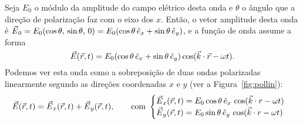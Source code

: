Seja $E_0$ o módulo
da amplitude do campo elétrico desta onda e $\theta$ o ângulo que a direção de
polarização faz com o
eixo dos $x$. Então, o vetor amplitude desta onda é $\vec
E_0=E_0(\cos\theta,\,\sin\theta,\,0)= E_0(\cos\theta\,\he_x+\sin\theta\,\he_y)$,
e a função de onda assume a forma
\begin{equation*}
\vec E(\vec r,t)=E_0(\cos\theta\,\he_x+\sin\theta\,\he_y)
\cos(\vec k\cdot\vec r-\omega t).
\end{equation*}
Podemos ver esta onda como a sobreposição de duas ondas polarizadas linearmente
segundo as direções coordenadas $x$ e $y$ (ver a Figura~\ref{fig:pollin}):
\begin{equation}\label{eq:lpdec}
\vec E(\vec r,t)=\vec E_x(\vec r,t)+\vec E_y(\vec r,t),\qquad\text{com }
\begin{cases}
\vec E_x(\vec r,t)=E_0\cos\theta\,\he_x\,\cos(\vec k\cdot r-\omega t)\\
\vec E_y(\vec r,t)=E_0\sin\theta\,\he_y\,\cos(\vec k\cdot r-\omega t)
\end{cases}
\end{equation}
